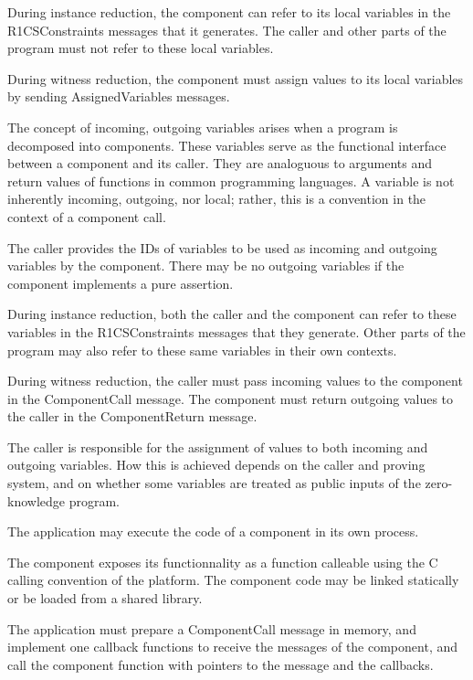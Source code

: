 	During instance reduction, the component can refer to
	its local variables in the R1CSConstraints messages that it generates.
	The caller and other parts of the program must not refer to these local variables.

	During witness reduction, the component must assign values to its local variables
	by sending AssignedVariables messages.


	The concept of incoming, outgoing variables arises when a program is decomposed into components.
	These variables serve as the functional interface between a component and its caller.
	They are analoguous to arguments and return values of functions in common programming languages.
	A variable is not inherently incoming, outgoing, nor local;
	rather, this is a convention in the context of a component call.

	The caller provides the IDs of variables to be used as incoming and outgoing variables by the component.
	There may be no outgoing variables if the component implements a pure assertion.

	During instance reduction, both the caller and the component can refer to
	these variables in the R1CSConstraints messages that they generate.
	Other parts of the program may also refer to these same variables in their own contexts.

	During witness reduction, the caller must pass incoming values to the component in the ComponentCall message.
	The component must return outgoing values to the caller in the ComponentReturn message.

	The caller is responsible for the assignment of values to both incoming and outgoing variables.
	How this is achieved depends on the caller and proving system,
	and on whether some variables are treated as public inputs of the zero-knowledge program.


	The application may execute the code of a component in its own process.

	The component exposes its functionnality as a function calleable using the C calling convention of the platform. The component code may be linked statically or be loaded from a shared library.

	The application must prepare a ComponentCall message in memory, and implement one callback functions to receive the messages of the component,
	and call the component function with pointers to the message and the callbacks.

